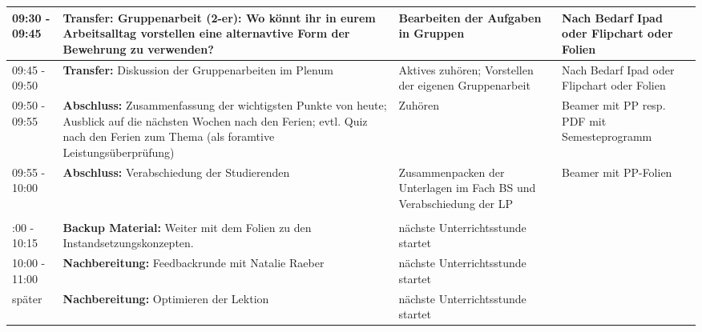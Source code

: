 \documentclass[
11pt,
captions=tableheading,
headsepline,
footsepline, 
captions=tableheading,
parskip=half-,
]{scrartcl}
\begin{document}
\begin{landscape}
\begin{longtable}{@{}l|p{9cm}p{7.5cm}p{3.5cm}@{}}
    \midrule
    09:30 - 09:45 & \textbf{Transfer:} Gruppenarbeit (2-er): Wo könnt ihr in eurem Arbeitsalltag vorstellen eine alternavtive Form der Bewehrung zu verwenden? & Bearbeiten der Aufgaben in Gruppen & Nach Bedarf Ipad oder Flipchart oder Folien\\
    \midrule
    09:45 - 09:50 & \textbf{Transfer:} Diskussion der Gruppenarbeiten im Plenum  & Aktives zuhören; Vorstellen der eigenen Gruppenarbeit & Nach Bedarf Ipad oder Flipchart oder Folien\\
    \midrule
    09:50 - 09:55 & \textbf{Abschluss:} Zusammenfassung der wichtigsten Punkte von heute; Ausblick auf die nächsten Wochen nach den Ferien; evtl. Quiz nach den Ferien zum Thema (als foramtive Leistungsüberprüfung)& Zuhören & Beamer mit PP resp. PDF mit Semesteprogramm\\
    \midrule
    09:55 - 10:00 & \textbf{Abschluss:} Verabschiedung der Studierenden & Zusammenpacken der Unterlagen im Fach BS und Verabschiedung der LP & Beamer mit PP-Folien\\
    \midrule
    \\ \addlinespace
    \midrule
    10:00 - 10:15 & \textbf{Backup Material:} Weiter mit dem Folien zu den Instandsetzungskonzepten. & nächste Unterrichtsstunde startet & {}\\
    \midrule
    10:00 - 11:00 & \textbf{Nachbereitung:} Feedbackrunde mit Natalie Raeber & nächste Unterrichtsstunde startet & {}\\
    \midrule
    später & \textbf{Nachbereitung:} Optimieren der Lektion & nächste Unterrichtsstunde startet & {}\\
    \bottomrule
\end{longtable}
\end{landscape}
\clearpage
\end{document}
